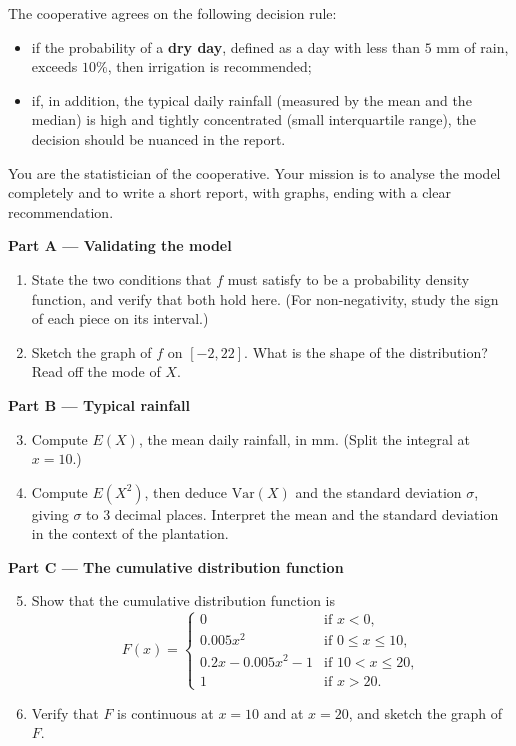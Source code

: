 \documentclass[11pt]{article}
\newcounter{popsec}
\newcounter{popsub}
\newcommand{\courssub}[1]{%
  \stepcounter{popsub}%
  \par\vspace{9pt}\noindent{\popxbold\fontsize{11.5}{13}\selectfont\color{popink}{\color{poporange}\thepopsec.\thepopsub}\hspace{6pt}#1}\par\nopagebreak\vspace{4pt}
}
\begin{document}
The cooperative agrees on the following decision rule:

\begin{itemize}
\item if the probability of a \textbf{dry day}, defined as a day with less than $5$ mm of rain, exceeds $10\%$, then irrigation is recommended;
\item if, in addition, the typical daily rainfall (measured by the mean and the median) is high and tightly concentrated (small interquartile range), the decision should be nuanced in the report.
\end{itemize}

You are the statistician of the cooperative. Your mission is to analyse the model completely and to write a short report, with graphs, ending with a clear recommendation.

\courssub{Tasks}

\textbf{Part A --- Validating the model}

\begin{enumerate}
\item State the two conditions that $f$ must satisfy to be a probability density function, and verify that both hold here. (For non-negativity, study the sign of each piece on its interval.)
\item Sketch the graph of $f$ on $[-2,22]$. What is the shape of the distribution? Read off the mode of $X$.
\end{enumerate}

\textbf{Part B --- Typical rainfall}

\begin{enumerate}
\setcounter{enumi}{2}
\item Compute $E(X)$, the mean daily rainfall, in mm. (Split the integral at $x=10$.)
\item Compute $E(X^2)$, then deduce $\mathrm{Var}(X)$ and the standard deviation $\sigma$, giving $\sigma$ to 3 decimal places. Interpret the mean and the standard deviation in the context of the plantation.
\end{enumerate}

\textbf{Part C --- The cumulative distribution function}

\begin{enumerate}
\setcounter{enumi}{4}
\item Show that the cumulative distribution function is
\[
F(x)=\begin{cases}
0 & \text{if } x<0,\\
0.005x^2 & \text{if } 0\leq x\leq 10,\\
0.2x-0.005x^2-1 & \text{if } 10<x\leq 20,\\
1 & \text{if } x>20.
\end{cases}
\]
\item Verify that $F$ is continuous at $x=10$ and at $x=20$, and sketch the graph of $F$.
\end{enumerate}
\end{document}

